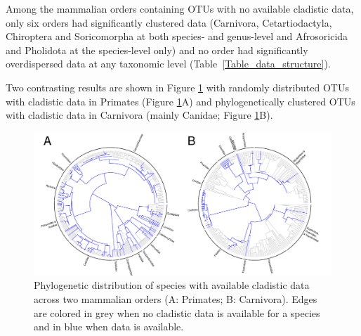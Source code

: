 \documentclass[12pt,letterpaper]{article}
\begin{document}


Among the mammalian orders containing OTUs with no available cladistic data, only six orders had significantly clustered data (Carnivora, Cetartiodactyla, Chiroptera and Soricomorpha at both species- and genus-level and Afrosoricida and Pholidota at the species-level only) and no order had significantly overdispersed data at any taxonomic level (Table~\ref{Table_data_structure}).

Two contrasting results are shown in Figure \ref{Figure_example_coverage} with randomly distributed OTUs with cladistic data in Primates (Figure \ref{Figure_example_coverage}A) and phylogenetically clustered OTUs with cladistic data in Carnivora (mainly Canidae; Figure \ref{Figure_example_coverage}B).

\begin{figure}[!htbp]
\centering
    \includegraphics[width=1\textwidth]{example_coverage.pdf}
\caption{Phylogenetic distribution of species with available cladistic data across two mammalian orders (A: Primates; B: Carnivora).
Edges are colored in grey when no cladistic data is available for a species and in blue when data is available.}
\label{Figure_example_coverage}
\end{figure}

%
%
\end{document}
